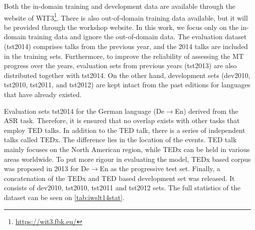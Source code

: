 Both the in-domain training and development data are available through the website of WIT3\footnote{\url{https://wit3.fbk.eu/}}. There is also out-of-domain training data available, but it will be provided through the workshop website. In this work, we focus only on the in-domain training data and ignore the out-of-domain data. The evaluation dataset (tst2014) comprises talks from the previous year, and the 2014 talks are included in the training sets. Furthermore, to improve the reliability of assessing the MT progress over the years, evaluation sets from previous years (tst2013) are also distributed together with tst2014. On the other hand, development sets (dev2010, tst2010, tst2011, and tst2012) are kept intact from the past editions for languages that have already existed.

Evaluation sets tst2014 for the German language (De$\rightarrow$En) derived from the ASR task. Therefore, it is ensured that no overlap exists with other tasks that employ TED talks. In addition to the TED talk, there is a series of independent talks called TEDx. The difference lies in the location of the events. TED talk mainly focuses on the North American region, while TEDx can be held in various areas worldwide. To put more rigour in evaluating the model, TEDx based corpus was proposed in 2013 for De$\rightarrow$En as the progressive test set. Finally, a concatenation of the TEDx and TED based development set was released. It consists of dev2010, tst2010, tst2011 and tst2012 sets. The full statistics of the dataset can be seen on \ref{tab:iwslt14stat}.

